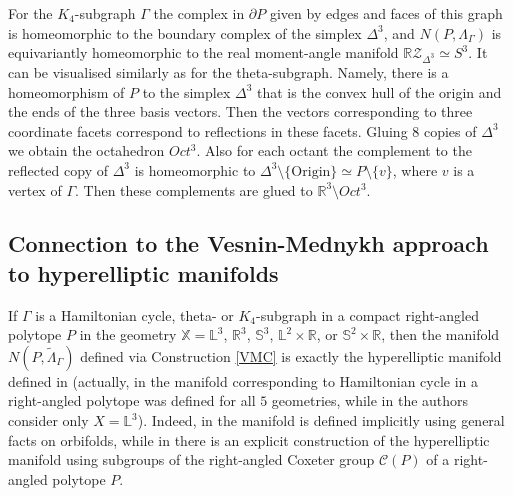 \documentclass[12pt]{amsart}
\theoremstyle{definition}
\theoremstyle{remark}
\newtheorem{remark}[formula]{Remark}
\begin{document}
For the $K_4$-subgraph $\Gamma$ the complex in $\partial P$ given by edges and faces of this graph is 
homeomorphic to the boundary complex of the simplex $\Delta^3$, and $N(P,\Lambda_{\Gamma})$ is
equivariantly homeomorphic to the real moment-angle manifold $\mathbb R\mathcal{Z}_{\Delta^3}\simeq S^3$. 
It can be visualised similarly as for the theta-subgraph. Namely, there is a homeomorphism of $P$
to the simplex $\Delta^3$ that is the convex hull of the origin and the ends of the three basis vectors. Then the vectors
corresponding to three coordinate facets correspond to reflections in these facets.
Gluing $8$ copies of  $\Delta^3$ we obtain the octahedron $Oct^3$. Also for each octant the complement to the reflected
copy of $\Delta^3$ is homeomorphic to $\Delta^3\setminus\{\text{Origin}\}\simeq P\setminus\{v\}$, 
where $v$ is a vertex of $\Gamma$.
Then these complements are glued to $\mathbb R^3\setminus Oct^3$. 
% 

\subsection{Connection to the Vesnin-Mednykh approach to hyperelliptic manifolds}
If $\Gamma$ is a Hamiltonian cycle, theta- or $K_4$-subgraph in a compact right-angled polytope $P$ in the geometry $\mathbb X=\mathbb L^3$, $\mathbb R^3$, $\mathbb S^3$,
$\mathbb L^2\times \mathbb R$, or $\mathbb S^2\times \mathbb R$, then the manifold
$N(P,\widetilde{\Lambda}_{\Gamma})$ defined via Construction \ref{VMC} is exactly the hyperelliptic manifold
defined in \cite{M90, VM99S2} (actually, in \cite{M90} the manifold corresponding to Hamiltonian cycle in a right-angled polytope
was defined for all $5$ geometries, while in \cite{VM99S2} the authors consider only $X=\mathbb L^3$).   
Indeed, in \cite{M90} the manifold is defined implicitly using general facts on orbifolds, while in \cite[Section 3]{VM99S2} 
there is an explicit
construction of the hyperelliptic manifold using subgroups of the right-angled Coxeter group $\mathcal{C}(P)$ of 
a right-angled polytope $P$.
\end{document}
